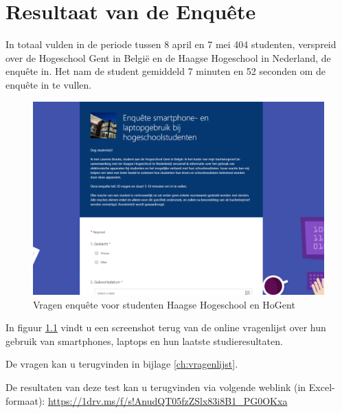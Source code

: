 
\chapter{Resultaat van de Enquête}
\label{ch:resultaten_vragen}

In totaal vulden in de periode tussen 8 april en 7 mei 404 studenten, verspreid over de Hogeschool Gent in België en de Haagse Hogeschool in Nederland, de enquête in. Het nam de student gemiddeld 7 minuten en 52 seconden om de enquête in te vullen.

\begin{figure}
	\includegraphics[width=\textwidth]
	{img/vragen-enquete.png}
	\caption{Vragen enquête voor studenten Haagse Hogeschool en HoGent }
	\label{fig:vragen-enquete}
\end{figure}

In figuur \ref{fig:vragen-enquete} vindt u een screenshot terug van de online vragenlijst over hun gebruik van smartphones, laptops en hun laatste studieresultaten. 

De vragen kan u terugvinden in bijlage \ref{ch:vragenlijst}.

De resultaten van deze test kan u terugvinden via volgende weblink (in Excel-formaat): \url{https://1drv.ms/f/s!AnudQT05fzZSlx83i8B1_PG0OKxa} 

